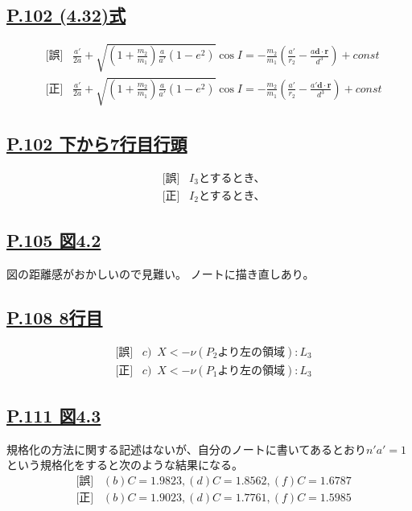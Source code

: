\documentclass[9pt,fleqn]{bxjsarticle}
\begin{document}
\subsection*{\underline{P.102 (4.32)式}}
\begin{align*}
    &\text{[誤]} \hspace{10pt} \frac{a'}{2a} + \sqrt{\left(1+\frac{m_2}{m_1}\right)\frac{a}{a'}\left(1-e^2\right)}\cos{I} = -\frac{m_2}{m_1}\left(\frac{a'}{r_2}-\frac{a\bm{d}\cdot\bm{r}}{d^3}\right) + const \\
    &\text{[正]} \hspace{10pt} \frac{a'}{2a} + \sqrt{\left(1+\frac{m_2}{m_1}\right)\frac{a}{a'}\left(1-e^2\right)}\cos{I} = -\frac{m_2}{m_1}\left(\frac{a'}{r_2}-\frac{a'\bm{d}\cdot\bm{r}}{d^3}\right) + const  
\end{align*}

\subsection*{\underline{P.102 下から7行目行頭}}
\begin{align*}
    &\text{[誤]} \hspace{10pt} I_3\text{とするとき、} \\
    &\text{[正]} \hspace{10pt} I_2\text{とするとき、}
\end{align*}

\subsection*{\underline{P.105 図4.2}}
図の距離感がおかしいので見難い。
ノートに描き直しあり。

\subsection*{\underline{P.108 8行目}}
\begin{align*}
    &\text{[誤]} \hspace{10pt} c) \,\,\, X<-\nu\left(P_2\text{より左の領域}\right):L_3 \\
    &\text{[正]} \hspace{10pt} c) \,\,\,X<-\nu\left(P_1\text{より左の領域}\right):L_3 
\end{align*}

\subsection*{\underline{P.111 図4.3}}
規格化の方法に関する記述はないが、自分のノートに書いてあるとおり$n'a'=1$という規格化をすると次のような結果になる。
\begin{align*}
    &\text{[誤]} \hspace{10pt} (b) C=1.9823, (d) C=1.8562, (f) C=1.6787 \\
    &\text{[正]} \hspace{10pt} (b) C=1.9023, (d) C=1.7761, (f) C=1.5985 
\end{align*}
\end{document}
